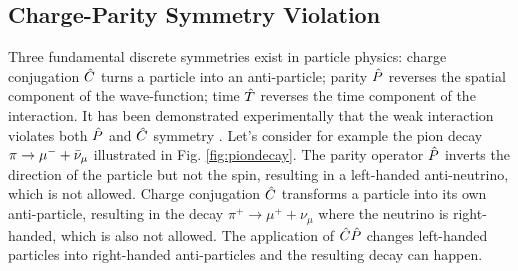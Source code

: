 \subsection{Charge-Parity Symmetry Violation}
Three fundamental discrete symmetries exist in particle physics: charge conjugation $\Hat{C}$ turns a particle into an anti-particle; parity $\Hat{P}$ reverses the spatial component of the wave-function; time $\Hat{T}$ reverses the time component of the interaction. It has been demonstrated experimentally that the weak interaction violates both $\Hat{P}$ and $\Hat{C}$ symmetry \cite{Boyde2005}. Let's consider for example the pion decay $\pi \rightarrow \mu^- + \Bar{\nu}_\mu$ illustrated in Fig. \ref{fig:piondecay}. The parity operator $\Hat{P}$ inverts the direction of the particle but not the spin, resulting in a left-handed anti-neutrino, which is not allowed. Charge conjugation $\Hat{C}$ transforms a particle into its own anti-particle, resulting in the decay $\pi^+ \rightarrow \mu^+ + \nu_\mu$ where the neutrino is right-handed, which is also not allowed. The application of $\Hat{C}\Hat{P}$ changes left-handed particles into right-handed anti-particles and the resulting decay can happen. 

